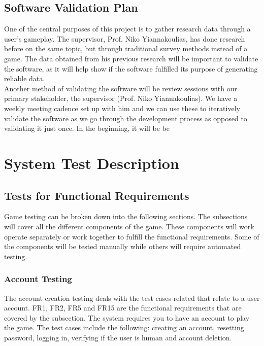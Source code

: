 \documentclass[12pt, titlepage]{article}
\begin{document}
\subsection{Software Validation Plan}


  One of the central purposes of this project is to gather research data through a user's gameplay. The supervisor, Prof. Niko Yiannakoulias, has done research before on the same topic, but through traditional survey methods instead of a game. The data obtained from his previous research will be important to validate the software, as it will help show if the software fulfilled its purpose of generating reliable data.
  \\ 

Another method of validating the software will be review sessions with our primary stakeholder, the supervisor (Prof. Niko Yiannakoulias). We have a weekly meeting cadence set up with him and we can use these to iteratively validate the software as we go through the development process as opposed to validating it just once. In the beginning, it will be be

\section{System Test Description}
	
\subsection{Tests for Functional Requirements}

Game testing can be broken down into the following sections. The subsections will cover all the different components of the game. These components will work operate separately or work together to fulfill the functional requirements. Some of the components will be tested manually while others will require automated testing.


\subsubsection{Account Testing}

The account creation testing deals with the test cases related that relate to a user account. FR1, FR2, FR5 and FR15 are the functional requirements that are covered by the subsection. The system requires you to have an account to play the game. The test cases include the following: creating an account, resetting password, logging in, verifying if the user is human and account deletion.
\end{document}
